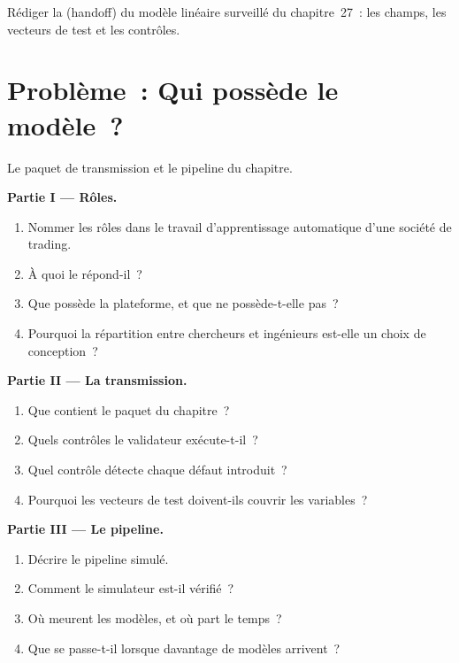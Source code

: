 \begin{exercise}[$\star\star\star$]\label{exo:ml:the-machine-learning-team:8}
Rédiger la  (handoff) du modèle linéaire surveillé du chapitre~27~: les champs, les vecteurs de test et les contrôles.
\end{exercise}

\section{Problème~: Qui possède le modèle~?}

\begin{problem}\label{pb:ml:the-machine-learning-team:1}
Le paquet de transmission et le pipeline du chapitre.

\medskip\noindent\textbf{Partie I --- Rôles.}
\begin{enumerate}
\item Nommer les rôles dans le travail d'apprentissage automatique d'une société de trading.
\item À quoi le  répond-il~?
\item Que possède la plateforme, et que ne possède-t-elle pas~?
\item Pourquoi la répartition entre chercheurs et ingénieurs est-elle un choix de conception~?
\end{enumerate}

\medskip\noindent\textbf{Partie II --- La transmission.}
\begin{enumerate}[resume]
\item Que contient le paquet du chapitre~?
\item Quels contrôles le validateur exécute-t-il~?
\item Quel contrôle détecte chaque défaut introduit~?
\item Pourquoi les vecteurs de test doivent-ils couvrir les variables~?
\end{enumerate}

\medskip\noindent\textbf{Partie III --- Le pipeline.}
\begin{enumerate}[resume]
\item Décrire le pipeline simulé.
\item Comment le simulateur est-il vérifié~?
\item Où meurent les modèles, et où part le temps~?
\item Que se passe-t-il lorsque davantage de modèles arrivent~?
\end{enumerate}


\end{problem}

